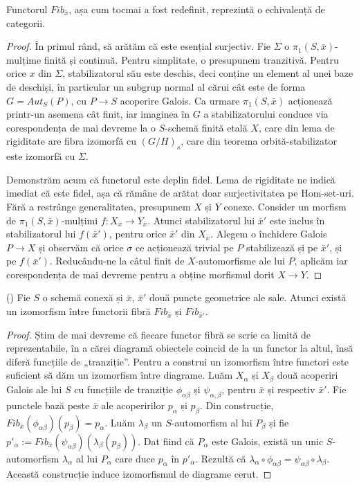 \documentclass[13pt,openany,oneside]{book}
\begin{document}
\begin{teo}
Functorul $Fib_{\bar{x}}$, așa cum tocmai a fost redefinit, reprezintă o echivalență de categorii.
\end{teo}

\begin{proof}
În primul rând, să arătăm că este esențial surjectiv. Fie $\Sigma$ o $\pi_1(S,\bar{x})$-mulțime finită și continuă. Pentru simplitate, o presupunem tranzitivă. Pentru orice $x$ din $\Sigma$, stabilizatorul său este deschis, deci conține un element al unei baze de deschiși, în particular un subgrup normal al cărui cât este de forma $G=Aut_S(P)$, cu $P \rightarrow S$ acoperire Galois. Ca urmare $\pi_1(S,\bar{x})$ acționează printr-un asemena cât finit, iar imaginea în $G$ a stabilizatorului conduce via corespondența de mai devreme la o $S$-schemă finită etală $X$, care din lema de rigiditate are fibra izomorfă cu $(G/H)_s$, care din teorema orbită-stabilizator este izomorfă cu $\Sigma$.

Demonstrăm acum că functorul este deplin fidel. Lema de rigiditate ne indică imediat că este fidel, așa că rămâne de arătat doar surjectivitatea pe Hom-set-uri. Fără a restrânge generalitatea, presupunem $X$ și $Y$ conexe. Consider un morfism de $\pi_1(S,\bar{x})$-mulțimi $f:X_{\bar{x}} \rightarrow Y_{\bar{x}}$. Atunci stabilizatorul lui $\bar{x}'$ este inclus în stabilizatorul lui $f(\bar{x}')$, pentru orice $\bar{x}'$ din $X_{\bar{x}}$. Alegem o închidere Galois $P \rightarrow X$ și observăm că orice $\sigma$ ce acționează trivial pe $P$ stabilizează și pe $\bar{x}'$, și pe $f(\bar{x}')$. Reducându-ne la câtul finit de $X$-automorfisme ale lui $P$, aplicăm iar corespondența de mai devreme pentru a obține morfismul dorit $X \rightarrow Y$.
\end{proof}

\begin{prop}
(\cite{szam}) Fie $S$ o schemă conexă și $\bar{x}$, $\bar{x}'$ două puncte geometrice ale sale. Atunci există un izomorfism între functorii fibră $Fib_{\bar{x}}$ și $Fib_{\bar{x}'}$.
\end{prop}

\begin{proof}
Știm de mai devreme că fiecare functor fibră se scrie ca limită de reprezentabile, în a cărei diagramă obiectele coincid de la un functor la altul, însă diferă funcțiile de „tranziție”. Pentru a construi un izomorfism între functori este suficient să dăm un izomorfism între diagrame. Luăm $X_\alpha$ și $X_\beta$ două acoperiri Galois ale lui $S$ cu funcțiile de tranziție $\phi_{\alpha\beta}$ și $\psi_{\alpha,\beta}$, pentru $\bar{x}$ și respectiv $\bar{x}'$. Fie punctele bază peste $\bar{x}$ ale acoperirilor $p_\alpha$ și $p_\beta$. Din construcție, $Fib_{\bar{x}}(\phi_{\alpha\beta})(p_\beta)=p_\alpha$. Luăm $\lambda_\beta$ un $S$-automorfism al lui $P_\beta$ și fie $p'_\alpha:=Fib_{\bar{x}}(\psi_{\alpha\beta})(\lambda_\beta(p_\beta))$. Dat fiind că $P_\alpha$ este Galois, există un unic $S$-automorfism $\lambda_\alpha$ al lui $P_\alpha$ care duce $p_\alpha$ în $p'_\alpha$. Rezultă că $\lambda_\alpha \circ \phi_{\alpha\beta} = \psi_{\alpha\beta} \circ \lambda_\beta$. Această construcție induce izomorfismul de diagrame cerut.
\end{proof}
\end{document}
